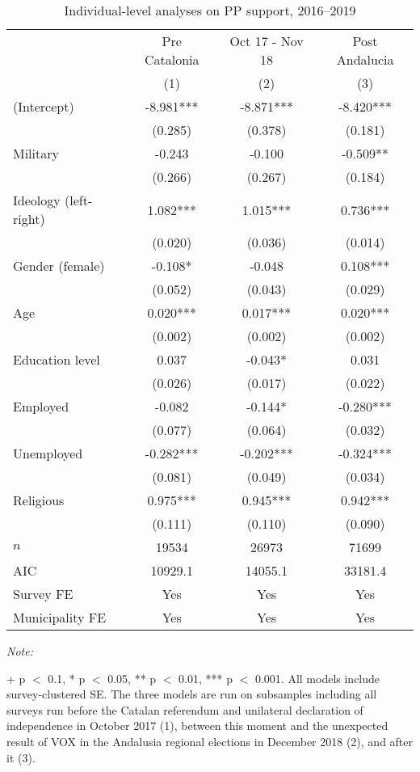 \begin{table}[!h]

\caption{Individual-level analyses on PP support, 2016--2019\label{tab:survey_glm_PP}}
\centering
\begin{threeparttable}
\begin{tabular}[t]{lccc}
\toprule
\multicolumn{1}{c}{ } & \multicolumn{1}{c}{Pre Catalonia} & \multicolumn{1}{c}{Oct 17 - Nov 18} & \multicolumn{1}{c}{Post Andalucia} \\
\cmidrule(l{3pt}r{3pt}){2-2} \cmidrule(l{3pt}r{3pt}){3-3} \cmidrule(l{3pt}r{3pt}){4-4}
  & (1) & (2) & (3)\\
\midrule
(Intercept) & -8.981*** & -8.871*** & -8.420***\\
 & (0.285) & (0.378) & (0.181)\\
Military & -0.243 & -0.100 & -0.509**\\
 & (0.266) & (0.267) & (0.184)\\
Ideology (left-right) & 1.082*** & 1.015*** & 0.736***\\
 & (0.020) & (0.036) & (0.014)\\
Gender (female) & -0.108* & -0.048 & 0.108***\\
 & (0.052) & (0.043) & (0.029)\\
Age & 0.020*** & 0.017*** & 0.020***\\
 & (0.002) & (0.002) & (0.002)\\
Education level & 0.037 & -0.043* & 0.031\\
 & (0.026) & (0.017) & (0.022)\\
Employed & -0.082 & -0.144* & -0.280***\\
 & (0.077) & (0.064) & (0.032)\\
Unemployed & -0.282*** & -0.202*** & -0.324***\\
 & (0.081) & (0.049) & (0.034)\\
Religious & 0.975*** & 0.945*** & 0.942***\\
 & (0.111) & (0.110) & (0.090)\\
\midrule
$n$ & 19534 & 26973 & 71699\\
AIC & 10929.1 & 14055.1 & 33181.4\\
Survey FE & Yes & Yes & Yes\\
Municipality FE & Yes & Yes & Yes\\
\bottomrule
\end{tabular}
\begin{tablenotes}[para]
\item \textit{Note: } 
\item + p $<$ 0.1, * p $<$ 0.05, ** p $<$ 0.01, *** p $<$ 0.001. All models include survey-clustered SE. The three models are run on subsamples including all surveys run before the Catalan referendum and unilateral declaration of independence in October 2017 (1), between this moment and the unexpected result of VOX in the Andalusia regional elections in December 2018 (2), and after it (3).
\end{tablenotes}
\end{threeparttable}
\end{table}
